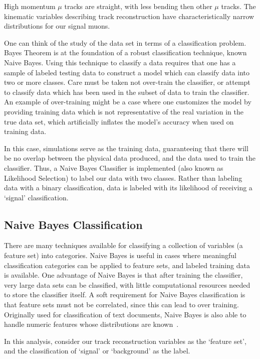 High momentum $\mu$ tracks are straight, with less bending then other $\mu$
tracks. The kinematic variables describing track reconstruction have
characteristically narrow distributions for our signal muons.

One can think of the study of the data set in terms of a classification problem.
Bayes Theorem is at the foundation of a robust classification technique, known
Naive Bayes. Using this technique to classify a data requires that one has a
sample of labeled testing data to construct a model which can classify data into
two or more classes. Care must be taken not over-train the classifier, or
attempt to classify data which has been used in the subset of data to train the
classifier. An example of over-training might be a case where one customizes the
model by providing training data which is not representative of the real
variation in the true data set, which artificially inflates the model's
accuracy when used on training data.

In this case, simulations serve as the training data, guaranteeing that there
will be no overlap between the physical data produced, and the data used to
train the classifier. Thus, a Naive Bayes Classifier is implemented (also known
as Likelihood Selection) to label our data with two classes. Rather than
labeling data with a binary classification, data is labeled with its likelihood
of receiving a `signal' classification.

\subsection{Naive Bayes Classification}

There are many techniques available for classifying a collection of variables (a
feature set) into categories. Naive Bayes is  useful in cases where meaningful
classification categories can be applied to feature sets, and labeled training
data is available. One advantage of Naive Bayes is that after training the
classifier, very large data sets can be classified, with little computational
resources needed to store the classifier itself. A soft requirement for Naive
Bayes classification is that feature sets must not be correlated, since this can
lead to over training. Originally used for classification of text documents,
Naive Bayes is also able to handle numeric features whose distributions are
known~\cite{Collins2013}.

In this analysis, consider our track reconstruction variables as the `feature
set', and the classification of `signal' or `background' as the label.

